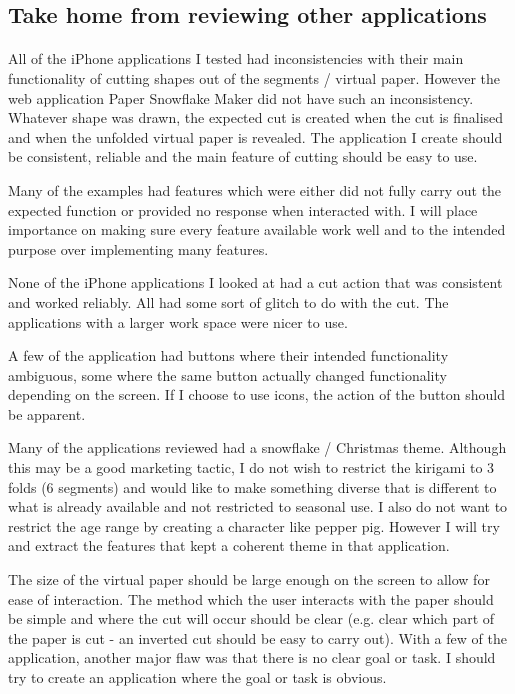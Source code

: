 \documentclass[11pt]{article}
\begin{document}
       \subsection{Take home from reviewing other applications}
       
            \paragraph{}
            All of the iPhone applications I tested had inconsistencies with their main functionality of cutting shapes out of the segments / virtual paper. However the web application Paper Snowflake Maker did not have such an inconsistency. Whatever shape was drawn, the expected cut is created when the cut is finalised and when the unfolded virtual paper is revealed. The application I create should be consistent, reliable and the main feature of cutting should be easy to use.  
            
            Many of the examples had features which were either did not fully carry out the expected function or provided no response when interacted with. I will place importance on making sure every feature available work well and to the intended purpose over implementing many features. 
            
            None of the iPhone applications I looked at had a cut action that was consistent and worked reliably. All had some sort of glitch to do with the cut. The applications with a larger work space were nicer to use. 
            
            A few of the application had buttons where their intended functionality ambiguous, some where the same button actually changed functionality depending on the screen. If I choose to use icons, the action of the button should be apparent.
            
            Many of the applications reviewed had a snowflake / Christmas theme. Although this may be a good marketing tactic, I do not wish to restrict the kirigami to 3 folds (6 segments) and would like to make something diverse that is different to what is already available and not restricted to seasonal use. I also do not want to restrict the age range by creating a character like pepper pig. However I will try and extract the features that kept a coherent theme in that application.
            
            The size of the virtual paper should be large enough on the screen to allow for ease of interaction. The method which the user interacts with the paper should be simple and where the cut will occur should be clear (e.g. clear which part of the paper is cut - an inverted cut should be easy to carry out). 
            With a few of the application, another major flaw was that there is no clear goal or task. I should try to create an application where the goal or task is obvious.
\end{document}
